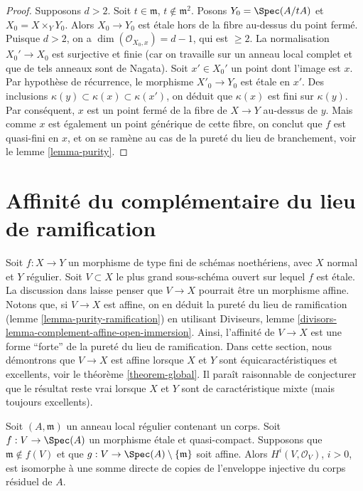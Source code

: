 \begin{proof}
\medskip\noindent
Supposons $d > 2$. Soit $t \in \mathfrak m$, $t \not \in \mathfrak m^2$.
Posons $Y_0 = \Spec(A/tA)$ et $X_0 = X \times_Y Y_0$.
Alors $X_0 \to Y_0$ est \'etale hors de la fibre au-dessus du point fermé.
Puisque $d > 2$, on a $\dim(\mathcal{O}_{X_0, x}) = d - 1$, qui est $\geq 2$.
La normalisation $X_0' \to X_0$ est surjective et finie
(car on travaille sur un anneau local complet et que de tels anneaux sont de Nagata).
Soit $x' \in X_0'$ un point dont l'image est $x$. Par hypothèse de récurrence, le
morphisme $X'_0 \to Y_0$ est \'etale en $x'$. Des inclusions
$\kappa(y) \subset \kappa(x) \subset \kappa(x')$,
on déduit que $\kappa(x)$ est fini sur $\kappa(y)$.
Par conséquent, $x$ est un point fermé de la fibre de $X \to Y$
au-dessus de $y$. Mais comme $x$ est également un point générique de
cette fibre, on conclut que $f$ est quasi-fini en $x$,
et on se ramène au cas de la pureté du lieu de branchement, voir le
lemme \ref{lemma-purity}.
\end{proof}




\section{Affinité du complémentaire du lieu de ramification}
\label{section-stronger-purity}

\noindent
Soit $f : X \to Y$ un morphisme de type fini de schémas noethériens,
avec $X$ normal et $Y$ régulier. Soit $V \subset X$ le plus grand
sous-schéma ouvert sur lequel $f$ est \'etale.
La discussion dans \cite[Chapter IV, Section 21.12]{EGA}
laisse penser que $V \to X$ pourrait être un morphisme affine.
Notons que, si $V \to X$ est affine, on en déduit la pureté du
lieu de ramification (lemme \ref{lemma-purity-ramification}) en
utilisant Diviseurs, lemme \ref{divisors-lemma-complement-affine-open-immersion}.
Ainsi, l'affinité de $V \to X$ est une forme ``forte'' de la pureté
du lieu de ramification.
Dans cette section, nous démontrons que $V \to X$ est affine lorsque
$X$ et $Y$ sont équicaractéristiques et excellents, voir le
théorème \ref{theorem-global}. Il paraît raisonnable
de conjecturer que le résultat reste vrai lorsque $X$ et $Y$ sont
de caractéristique mixte (mais toujours excellents).

\begin{lemma}
\label{lemma-structure-cohomology}
Soit $(A, \mathfrak m)$ un anneau local régulier contenant un corps.
Soit $f : V \to \Spec(A)$ un morphisme \'etale et quasi-compact.
Supposons que $\mathfrak m \not \in f(V)$ et que
$g : V \to \Spec(A) \setminus \{\mathfrak m\}$ soit affine.
Alors $H^i(V, \mathcal{O}_V)$, $i > 0$, est isomorphe à une somme
directe de copies de l'enveloppe injective du corps résiduel de $A$.
\end{lemma}

